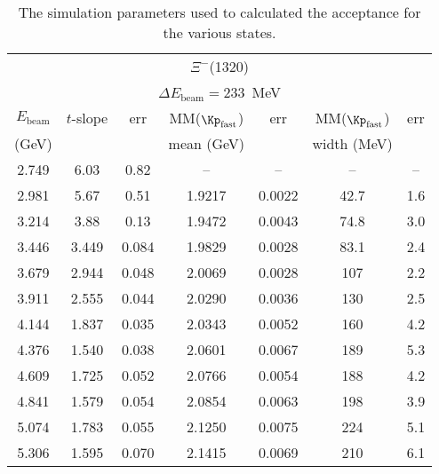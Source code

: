 \begin{table}[bh]
\begin{minipage}{\columnwidth}
\begin{center}
\begin{singlespacing}

\caption[Simulation Parameters]{\label{tab:sim.xi1320}The simulation parameters used to calculated the acceptance for the various states.}

\begin{tabular}{ccccccc}
\hline \hline
\multicolumn{7}{c}{$\Xi^-$(1320)} \\
\multicolumn{7}{c}{$\Delta E_\mathrm{beam} = 233$~MeV} \\
\hline
$E_\mathrm{beam}$ & $t$-slope & err & MM($\Kp_\mathrm{fast}$) & err & MM($\Kp_\mathrm{fast}$) & err \\
(GeV) &  &  & mean (GeV) & & width (MeV) & \\
\hline

2.749 & 6.03 & 0.82 & -- & -- & -- & -- \\
2.981 & 5.67 & 0.51 & 1.9217 & 0.0022 & 42.7 & 1.6 \\
3.214 & 3.88 & 0.13 & 1.9472 & 0.0043 & 74.8 & 3.0 \\
3.446 & 3.449 & 0.084 & 1.9829 & 0.0028 & 83.1 & 2.4 \\
3.679 & 2.944 & 0.048 & 2.0069 & 0.0028 & 107 & 2.2 \\
3.911 & 2.555 & 0.044 & 2.0290 & 0.0036 & 130 & 2.5 \\
4.144 & 1.837 & 0.035 & 2.0343 & 0.0052 & 160 & 4.2 \\
4.376 & 1.540 & 0.038 & 2.0601 & 0.0067 & 189 & 5.3 \\
4.609 & 1.725 & 0.052 & 2.0766 & 0.0054 & 188 & 4.2 \\
4.841 & 1.579 & 0.054 & 2.0854 & 0.0063 & 198 & 3.9 \\
5.074 & 1.783 & 0.055 & 2.1250 & 0.0075 & 224 & 5.1 \\
5.306 & 1.595 & 0.070 & 2.1415 & 0.0069 & 210 & 6.1 \\

\hline \hline
\end{tabular}


\end{singlespacing}
\end{center}
\end{minipage}
\end{table}
\vspace{20pt}
